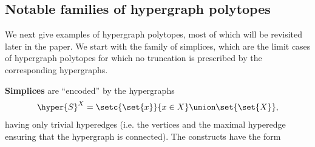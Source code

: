 \subsection{Notable families of hypergraph polytopes} \label{notable-section}
We next give examples of hypergraph polytopes, most of which will be revisited later in the paper. We start with the family of simplices, which are the limit cases of hypergraph polytopes for which no truncation is prescribed by the corresponding hypergraphs. 
\begin{example}\label{simp}
{\bf Simplices} are ``encoded'' by the hypergraphs  $$\hyper{S}^X=\setc{\set{x}}{x\in X}\union\set{\set{X}},$$ having only trivial hyperedges (i.e. the vertices and the maximal hyperedge ensuring that the hypergraph is connected). The constructs have the form 
\begin{center}
\end{center}
\end{example}

